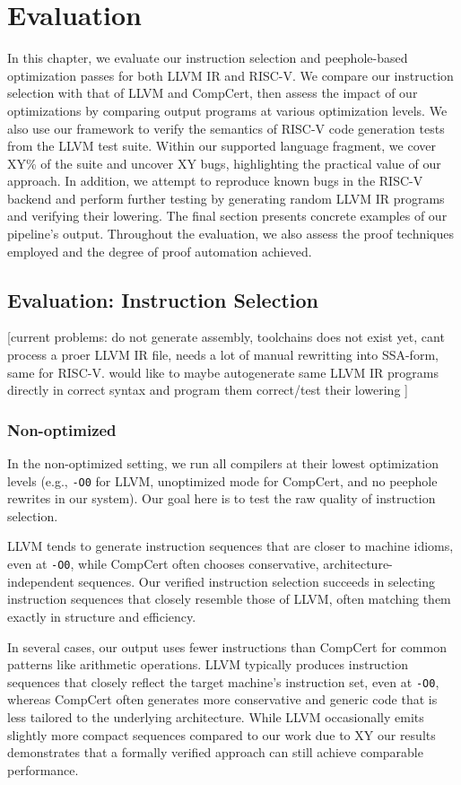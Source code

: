 \chapter{Evaluation}
In this chapter, we evaluate our instruction selection and peephole-based optimization passes for both LLVM IR and RISC-V. We compare our instruction selection with that of LLVM and CompCert, then assess the impact of our optimizations by comparing output programs at various optimization levels. We also use our framework to verify the semantics of RISC-V code generation tests from the LLVM test suite. Within our supported language fragment, we cover XY\% of the suite and uncover XY bugs, highlighting the practical value of our approach. In addition, we attempt to reproduce known bugs in the RISC-V backend and perform further testing by generating random LLVM IR programs and verifying their lowering. The final section presents concrete examples of our pipeline's output. Throughout the evaluation, we also assess the proof techniques employed and the degree of proof automation achieved.

\section{Evaluation: Instruction Selection}
[current problems: do not generate assembly, toolchains does not exist yet, cant process a proer LLVM IR file, needs a lot of manual rewritting into SSA-form, same for RISC-V.
would like to maybe autogenerate same LLVM IR programs directly in correct syntax and program them correct/test their lowering
]
\subsection{Non-optimized}
In the non-optimized setting, we run all compilers at their lowest optimization levels (e.g., \texttt{-O0} for LLVM, unoptimized mode for CompCert, and no peephole rewrites in our system). Our goal here is to test the raw quality of instruction selection.

LLVM tends to generate instruction sequences that are closer to machine idioms, even at \texttt{-O0}, while CompCert often chooses conservative, architecture-independent sequences. Our verified instruction selection succeeds in selecting instruction sequences that closely resemble those of LLVM, often matching them exactly in structure and efficiency.

In several cases, our output uses fewer instructions than CompCert for common patterns like arithmetic operations. LLVM typically produces instruction sequences that closely reflect the target machine's instruction set, even at \texttt{-O0}, whereas CompCert often generates more conservative and generic code that is less tailored to the underlying architecture. While LLVM occasionally emits slightly more compact sequences compared to our work due to XY  our results demonstrates that a formally verified approach can still achieve comparable performance.
